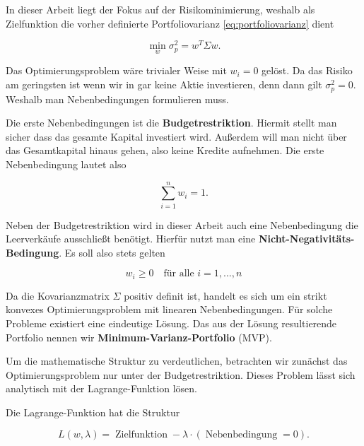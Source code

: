 \documentclass[parskip=half]{scrartcl}
\begin{document}
	In dieser Arbeit liegt der Fokus auf der Risikominimierung, weshalb als Zielfunktion die vorher definierte Portfoliovarianz \eqref{eq:portfoliovarianz} dient
	
	\begin{equation}
		\min_w \sigma_p^2 = w^T \Sigma w . \label{eq:zielfunktion}
	\end{equation}
	
	Das Optimierungsproblem wäre trivialer Weise mit $w_i = 0$ gelöst. Da das Risiko am geringsten ist wenn wir in gar keine Aktie investieren, denn dann gilt $\sigma_p^2 = 0$. Weshalb man Nebenbedingungen formulieren muss.
	
	Die erste Nebenbedingungen ist die \textbf{Budgetrestriktion}. Hiermit stellt man sicher dass das gesamte Kapital investiert wird. Außerdem will man nicht über das Gesamtkapital hinaus gehen, also keine Kredite aufnehmen. Die erste Nebenbedingung lautet also
	
	\begin{equation}
		\sum_{i=1}^{n} w_i = 1 . \label{eq:budgetrestriktion}
	\end{equation}
	
	Neben der Budgetrestriktion wird in dieser Arbeit auch eine Nebenbedingung die Leerverkäufe ausschließt benötigt. Hierfür nutzt man eine \textbf{Nicht-Negativitäts-Bedingung}. Es soll also stets gelten
	
	\begin{equation}
		w_i \geq 0 \quad \text{für alle } i = 1, ..., n \label{eq:nicht-negativ}
	\end{equation}
	
	Da die Kovarianzmatrix $\Sigma$ positiv definit ist, handelt es sich um ein strikt konvexes Optimierungsproblem mit linearen Nebenbedingungen. Für solche Probleme existiert eine eindeutige Lösung. Das aus der Lösung resultierende Portfolio nennen wir \textbf{Minimum-Varianz-Portfolio} (MVP).
	
	Um die mathematische Struktur zu verdeutlichen, betrachten wir zunächst das Optimierungsproblem nur unter der Budgetrestriktion. Dieses Problem lässt sich analytisch mit der Lagrange-Funktion lösen.
	
	Die Lagrange-Funktion hat die Struktur
	
	\begin{equation}
		L(w,\lambda) = \operatorname{Zielfunktion} - \lambda \cdot (\operatorname{Nebenbedingung} = 0) . \label{eq:lagrange}
	\end{equation}
	
\end{document}
